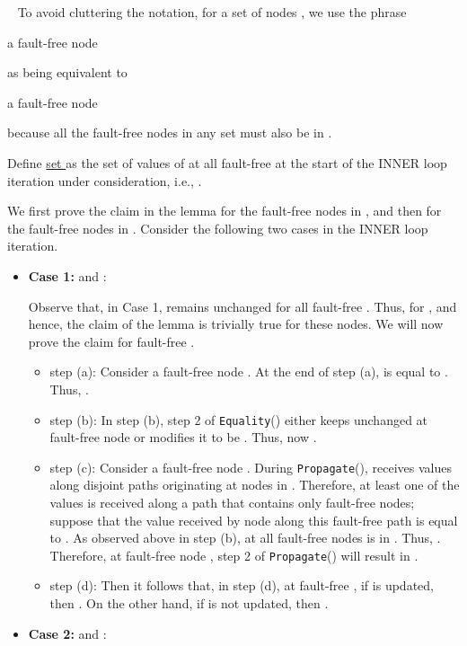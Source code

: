 \documentclass[letterpaper, 11pt]{article}
\newenvironment{proof}{\noindent {\bf Proof:}~}{\hspace*{\fill}}
\newcommand{\Propagate}{{\tt Propagate}}
\newcommand{\Equality}{{\tt Equality}}
\begin{document}
\begin{proof}
To avoid cluttering the notation, for a set of nodes , we use the phrase

\hspace{1in}a fault-free node 

\noindent
as being equivalent to

 \hspace{1in}a fault-free node 

\noindent
because all the fault-free nodes in any set  must also be in .

Define \underline{set } as the set of values of 
at all fault-free  at the start of the
INNER loop iteration under consideration, i.e., .

We first prove the claim in the lemma for the fault-free nodes in ,
and then for the fault-free nodes in .
Consider the following two cases in the INNER loop iteration.
\begin{itemize}
\item {\bf Case 1:}  and :

Observe that, in Case 1,  remains unchanged for all
fault-free . Thus,  for
, and hence, the claim of the lemma is trivially
true for these nodes. We will now prove the claim for fault-free .

\begin{itemize}
\item step (a):
Consider a fault-free node .
At the end of step (a),  is equal to . Thus,
.

\item step (b):
In step (b), step 2 of \Equality() either keeps  unchanged at
fault-free node 
or modifies it to be . Thus, now .

\item step (c):
Consider a fault-free node . During \Propagate(),
 receives  values along  disjoint paths originating
at nodes in . Therefore, at least one of the  values
is received along a path that contains only fault-free nodes;
suppose that the value received by node  along this fault-free path
is equal to . As observed above in step (b),
 at all fault-free nodes  is in . Thus,
.
Therefore, at fault-free node , step 2 of \Propagate() will result
in .

\item step (d):
Then it follows that, in step (d), at fault-free , if  is updated, then 
. On the other hand, if  is not updated, then .
\end{itemize}

\item {\bf Case 2:}  and :


\end{itemize}
\end{proof}
\end{document}
